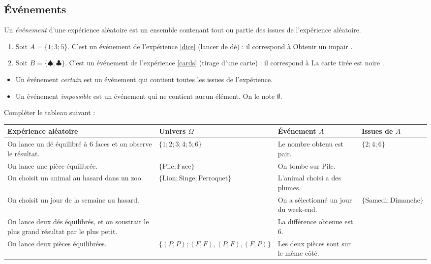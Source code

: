 \documentclass{article}
\begin{document}
\subsection{\'Evénements}
\begin{definition}
Un \emph{événement} d'une expérience aléatoire est un ensemble contenant tout ou partie des issues de l'expérience aléatoire.
\end{definition}
\begin{example}
\begin{enumerate}
\item Soit $A = \{1;3;5\}$. C'est un événement de l'expérience \ref{dice} (lancer de dé) : il correspond à \og Obtenir un impair \fg.
\item Soit $B = \{♠;♣\}$. C'est un événement de l'expérience \ref{cards} (tirage d'une carte) : il correspond à \og La carte tirée est noire \fg.
\end{enumerate}
\end{example}
\begin{vocabulary}
\begin{itemize}
\item Un événement \emph{certain} est un événement qui contient toutes les issues de l'expérience.  
\item Un événement \emph{impossible} est un événement qui ne contient aucun élément. On le note $\emptyset$.
\end{itemize}
\end{vocabulary}
\begin{exercize}
Compléter le tableau suivant :
\begin{center}
\begin{tabular}{|C{0.25\textwidth}|C{0.3\textwidth}|C{0.2\textwidth}|C{0.2\textwidth}|}
\hline
Expérience aléatoire & Univers $\Omega$ & \'Evénement $A$ & Issues de $A$ \\
\hline
On lance un dé équilibré à $6$ faces et on observe le résultat. & $\{1;2;3;4;5;6\}$ & Le nombre obtenu est pair. & $\{2;4;6\}$ \\
\hline
On lance une pièce équilibrée. & $\{\text{Pile};\text{Face}\}$ & On tombe sur Pile. & \\
\hline
On choisit un animal au hasard dans un zoo. & $\{\text{Lion};\text{Singe};\text{Perroquet}\}$ & L'animal choisi a des plumes. & \\
\hline
On choisit un jour de la semaine au hasard. & & On a sélectionné un jour du week-end. & $\{\text{Samedi};\text{Dimanche}\}$\\
\hline
On lance deux dés équilibrés, et on soustrait le plus grand résultat par le plus petit. & & La différence obtenue est $6$. & \\
\hline
On lance deux pièces équilibrées. & $\{(P,P);(F,F),(P,F),(F,P)\}$ & Les deux pièces sont sur le même côté. & \\
\hline 
\end{tabular}
\end{center}
\end{exercize}
\newpage
\end{document}
